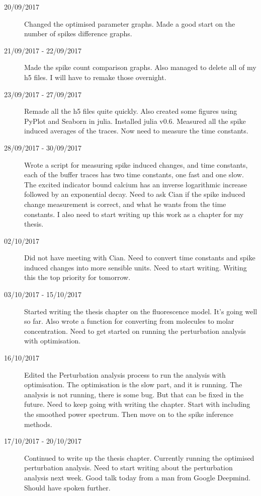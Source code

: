 \documentclass[a4paper,12pt]{article}
\theoremstyle{definition}
\begin{document}
\begin{description}
	\item[20/09/2017] Changed the optimised parameter graphs. Made a good start on the number of spikes difference graphs.

	\item[21/09/2017 - 22/09/2017] Made the spike count comparison graphs. Also managed to delete all of my h5 files. I will have to remake those overnight.

	\item[23/09/2017 - 27/09/2017] Remade all the h5 files quite quickly. Also created some figures using PyPlot and Seaborn in julia. Installed julia v0.6. Measured all the spike induced averages of the traces. Now need to measure the time constants.

	\item[28/09/2017 - 30/09/2017] Wrote a script for measuring spike induced changes, and time constants, each of the buffer traces has two time constants, one fast and one slow. The excited indicator bound calcium has an inverse logarithmic increase followed by an exponential decay. Need to ask Cian if the spike induced change measurement is correct, and what he wants from the time constants. I also need to start writing up this work as a chapter for my thesis.

	\item[02/10/2017] Did not have meeting with Cian. Need to convert time constants and spike induced changes into more sensible units. Need to start writing. Writing this the top priority for tomorrow.

	\item[03/10/2017 - 15/10/2017] Started writing the thesis chapter on the fluorescence model. It's going well so far. Also wrote a function for converting from molecules to molar concentration. Need to get started on running the perturbation analysis with optimisation.

	\item[16/10/2017] Edited the Perturbation analysis process to run the analysis with optimisation. The optimisation is the slow part, and it is running. The analysis is not running, there is some bug. But that can be fixed in the future. Need to keep going with writing the chapter. Start with including the smoothed power spectrum. Then move on to the spike inference methods.

	\item[17/10/2017 - 20/10/2017] Continued to write up the thesis chapter. Currently running the optimised perturbation analysis. Need to start writing about the perturbation analysis next week. Good talk today from a man from Google Deepmind. Should have spoken further.


\end{description}
\end{document}
